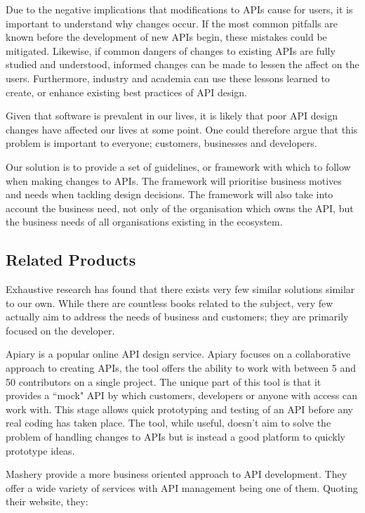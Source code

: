\documentclass{article}
\begin{document}
Due to the negative implications that modifications to APIs cause for users, it is important to understand why changes occur. If the most common pitfalls are known before the development of new APIs begin, these mistakes could be mitigated. Likewise, if common dangers of changes to existing APIs are fully studied and understood, informed changes can be made to lessen the affect on the users. Furthermore, industry and academia can use these lessons learned to create, or enhance existing best practices of API design.\smallskip

Given that software is prevalent in our lives, it is likely that poor API design changes have affected our lives at some point. One could therefore argue that this problem is important to everyone; customers, businesses and developers. \smallskip

Our solution is to provide a set of guidelines, or framework with which to follow when making changes to APIs. The framework will prioritise business motives and needs when tackling design decisions. The framework will also take into account the business need, not only of the organisation which owns the API, but the business needs of all organisations existing in the ecosystem.

\subsection{Related Products}
Exhaustive research has found that there exists very few similar solutions similar to our own. While there are countless books related to the subject, very few actually aim to address the needs of business and customers; they are primarily focused on the developer. \smallskip

Apiary is a popular online API design service. Apiary focuses on a collaborative approach to creating APIs, the tool offers the ability to work with between 5 and 50 contributors on a single project. The unique part of this tool is that it provides a ``mock" API by which customers, developers or anyone with access can work with. This stage allows quick prototyping and testing of an API before any real coding has taken place. The tool, while useful, doesn't aim to solve the problem of handling changes to APIs but is instead a good platform to quickly prototype ideas. \smallskip

Mashery provide a more business oriented approach to API development. They offer a wide variety of services with API management being one of them. Quoting their website, they: \smallskip
\end{document}
